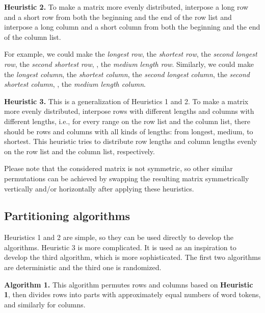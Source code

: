 \documentclass[10pt,conference]{IEEEtran}
\begin{document}
\textbf{Heuristic 2.} To make a matrix more evenly distributed, interpose a long row and a short row from both the beginning and the end of the row list and interpose a long column and a short column from both the beginning and the end of the column list. 

For example, we could make  the \textit{longest row},  the \textit{shortest row},  the \textit{second longest row},  the \textit{second shortest row}, ,  the \textit{medium length row}. Similarly, we could make  the \textit{longest column},  the \textit{shortest column},  the \textit{second longest column},  the \textit{second shortest column}, ,  the \textit{medium length column}.

\textbf{Heuristic 3.} This is a generalization of Heuristics 1 and 2. To make a matrix more evenly distributed, interpose rows with different lengths and columns with different lengths, i.e., for every range on the row list and the column list, there should be rows and columns with all kinds of lengths: from longest, medium, to shortest. This heuristic tries to distribute row lengths and column lengths evenly on the row list and the column list, respectively.

Please note that the considered matrix is not symmetric, so other similar permutations can be achieved by swapping the resulting matrix symmetrically vertically and/or horizontally after applying these heuristics.

\subsection{Partitioning algorithms}
Heuristics 1 and 2 are simple, so they can be used directly to develop the algorithms. Heuristic 3 is more complicated. It is used as an inspiration to develop the third algorithm, which is more sophisticated. The first two algorithms are deterministic and the third one is randomized.

\textbf{Algorithm 1.} This algorithm permutes rows and columns based on \textbf{Heuristic 1}, then divides rows into  parts with approximately equal numbers of word tokens, and similarly for columns.
\end{document}
